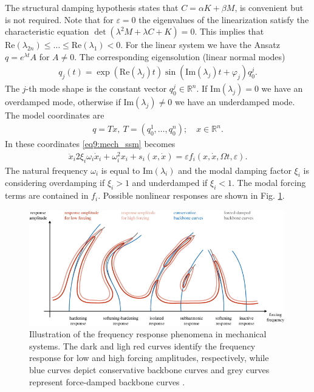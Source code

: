 The structural damping hypothesis states that $C = \alpha K + \beta M$, is convenient but is not required. Note that for $\varepsilon=0$ the eigenvalues of the linearization satisfy the characteristic equation $\det(\lambda^2 M + \lambda C + K) = 0$. This implies that $ \textrm{Re}(\lambda _{2n})\leq \ldots \leq  \textrm{Re} (\lambda _1) < 0$. For the linear system we have the Ansatz $q = e^{\lambda t}A$ for $A\neq 0$. The corresponding eigensolution (linear normal modes)
\begin{align}
	q_{j}(t) = \exp( \textrm{Re} (\lambda_j)t) \sin( \textrm{Im} (\lambda_j)t + \varphi_j) q_{0}^{j}.
\end{align}
The $j$-th mode shape is the constant vector $q_{0}^{j}\in \mathbb{R}^{n}$. If $ \textrm{Im} (\lambda_j) = 0$ we have an overdamped mode, otherwise if $ \textrm{Im} (\lambda _j)\neq 0$ we have an underdamped mode. The model coordinates are 
\begin{align}
	q=Tx,\ T = ( q_{0}^{1},\ldots, q_{0}^{n})	;\quad x \in \mathbb{R}^{n}.
\end{align}
In these coordinates \eqref{eq9:mech_ssm} becomes
\begin{align}
	\ddot{x}_{i}2 \xi_i\omega_i \dot{x}_{i} + \omega_{i}^{2}x_i + s_i(x, \dot{x}) = \varepsilon f_i(x, \dot{x}, \Omega t, \varepsilon).
\end{align}
The natural frequency $\omega_i$ is equal to $ \textrm{Im} (\lambda_i)$ and the modal damping factor $\xi_i$ is considering overdamping if $\xi_i >1$ and underdamped if $\xi_i<1$. The modal forcing terms are contained in $f_i$. Possible nonlinear responses are shown in Fig. \ref{fig:frf}.
\begin{figure}[h!]
	\centering
	\includegraphics[width=0.99\textwidth]{figures/ch9/frf.pdf}
	\caption{Illustration of the frequency response phenomena in mechanical systems. The dark and ligh red curves identify the frequency response for low and high forcing amplitudes, respectively, while blue curves depict conservative backbone curves and grey curves represent force-damped backbone curves \cite{Cenedese_2020}.}
	\label{fig:frf}
\end{figure}

